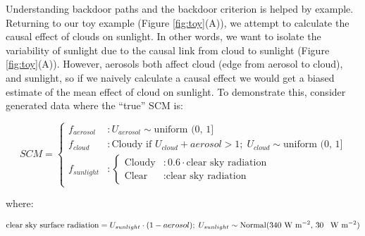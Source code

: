 \documentclass[12pt]{article}
\begin{document}
Understanding backdoor paths and the backdoor criterion is helped by
example. Returning to our toy example (Figure \ref{fig:toy}(A)), we
attempt to calculate the causal effect of clouds on sunlight. In other
words, we want to isolate the variability of sunlight due to the
causal link from cloud to sunlight (Figure \ref{fig:toy}(A)). However,
aerosols both affect cloud (edge from aerosol to cloud), and sunlight,
so if we naively calculate a causal effect we would get a biased
estimate of the mean effect of cloud on sunlight. To demonstrate this,
consider generated data where the ``true'' SCM is:

\begin{equation}
  SCM =
  \begin{cases}
    f_{aerosol} &: U_{aerosol} \sim \text{uniform (0, 1]}\\
    f_{cloud} &: \text{Cloudy if } U_{cloud} + aerosol > 1; \;
    U_{cloud} \sim \text{uniform (0, 1]}\\
    f_{sunlight} &: \begin{cases}
      \text{Cloudy} &: 0.6 \cdot \text{clear sky radiation}  \\
      \text{Clear} &: \text{clear sky radiation}
    \end{cases}
  \end{cases}
\end{equation}

where:

\begin{equation*}
  \text{clear sky surface radiation} = U_{sunlight} \cdot (1 - aerosol); \;
  U_{sunlight} \sim \text{Normal(340 W m$^{-2}$, 30 \, W m$^{-2}$)}
\end{equation*}
\end{document}
